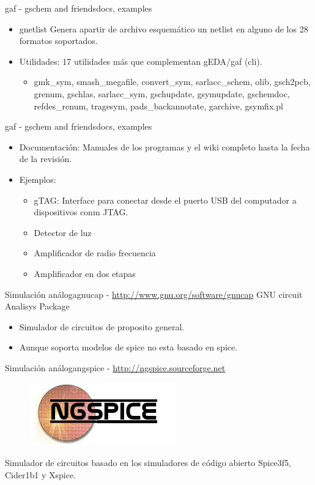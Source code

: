 \documentclass{beamer}
\begin{document}
\begin{frame}{gaf - gschem and friends}{docs, examples}
  \begin{itemize}
  \item \alert{gnetlist} Genera apartir de archivo esquemático un netlist en alguno de los 28 formatos soportados.
    \pause
  \item Utilidades: 17 utilidades más que complementan gEDA/gaf (cli).
    \begin{itemize}
    \item gmk\_sym, smash\_megafile, convert\_sym, sarlacc\_schem, olib, gsch2pcb, grenum, gschlas, sarlacc\_sym, gschupdate, gsymupdate, gschemdoc, refdes\_renum, tragesym, pads\_backannotate, garchive, gsymfix.pl
    \end{itemize}
  \end{itemize}
\end{frame}

\begin{frame}{gaf - gschem and friends}{docs, examples}
  \begin{itemize}
  \item Documentación: Manuales de los programas y el wiki completo hasta la fecha de la revisión.
    \pause
  \item Ejemplos:
    \begin{itemize}
    \item gTAG: Interface para conectar desde el puerto USB del computador a dispositivos conm JTAG.
    \item Detector de luz
    \item Amplificador de radio frecuencia
    \item Amplificador en dos etapas
    \end{itemize}
  \end{itemize}
\end{frame}

\begin{frame}{Simulación análoga}{\alert{gnucap} - \url{http://www.gnu.org/software/gnucap}}
  GNU circuit Analisys Package
  \begin{itemize}
  \item Simulador de circuitos de proposito general.
  \item Aunque soporta modelos de spice no esta basado en spice.
  \end{itemize}
\end{frame}

\begin{frame}{Simulación análoga}{\alert{ngspice} - \url{http://ngspice.sourceforge.net}}
  \begin{figure}[!h]
    \centering
    \includegraphics[scale=0.5]{img/nglogo.jpg}
  \end{figure}
  Simulador de circuitos basado en los simuladores de código abierto Spice3f5, Cider1b1 y Xspice.
\end{frame}
\end{document}
